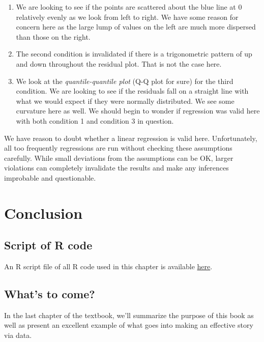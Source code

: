 \documentclass[]{tufte-book}
\begin{document}
\begin{enumerate}
\def\labelenumi{\arabic{enumi}.}
\item
  We are looking to see if the points are scattered about the blue line
  at 0 relatively evenly as we look from left to right. We have some
  reason for concern here as the large lump of values on the left are
  much more dispersed than those on the right.
\item
  The second condition is invalidated if there is a trigonometric
  pattern of up and down throughout the residual plot. That is not the
  case here.
\item
  We look at the \emph{quantile-quantile plot} (Q-Q plot for sure) for
  the third condition. We are looking to see if the residuals fall on a
  straight line with what we would expect if they were normally
  distributed. We see some curvature here as well. We should begin to
  wonder if regression was valid here with both condition 1 and
  condition 3 in question.
\end{enumerate}

We have reason to doubt whether a linear regression is valid here.
Unfortunately, all too frequently regressions are run without checking
these assumptions carefully. While small deviations from the assumptions
can be OK, larger violations can completely invalidate the results and
make any inferences improbable and questionable.

\section{Conclusion}\label{conclusion-5}

\subsection{Script of R code}\label{script-of-r-code-5}

An R script file of all R code used in this chapter is available
\href{http://ismayc.github.io/moderndiver-book/scripts/09-regress.R}{here}.

\subsection{What's to come?}\label{whats-to-come-6}

In the last chapter of the textbook, we'll summarize the purpose of this
book as well as present an excellent example of what goes into making an
effective story via data.
\end{document}
